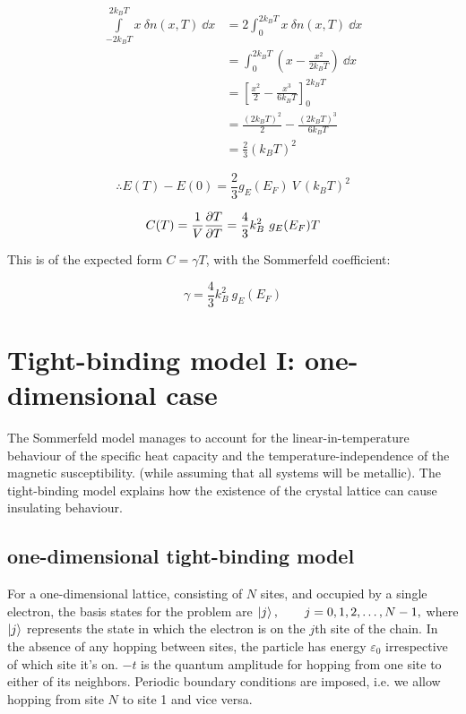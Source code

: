 \documentclass[10pt, a4paper, twocolumn]{article}
\newcommand{\eps}{\ensuremath{\varepsilon _0}}
\begin{document}
\begin{equation*}
\begin{aligned}
\int\limits_{-2k_BT}^{2k_BT}
x \ \delta n (x, T) \ \dd x &=
2 \int _0^{2 k_B T} x \ \delta n(x,T) \ \dd x
\\ &= \int _0^{2 k_B T}
\left( x - \frac{x^2}{2 k_B T} \right) \ \dd x
\\ &= \left[ \frac{x^2}{2} - \frac{x^3}{6 k_B T} \right]
_0^{2 k_B T}
\\ &= \frac{(2 k_B T)^2}{2}
- \frac{(2 k_B T)^3}{6 k_BT}
\\ &= \frac23 (k_B T)^2
\end{aligned}
\end{equation*}

\[\therefore E(T) - E(0) = \frac23 g_E (E_F) \ V
\ (k_B T)^2 \]

\[ C(T) = \frac1V \pdv{T}{T} = \frac43 k_B ^2
\ g_E(E_F) T \]

This is of the expected form $C = \gamma T$, with the Sommerfeld coefficient:

\[ \gamma = \frac43 k_B^2 \ g_E(E_F) \]

\section{Tight-binding model I: one-dimensional case}

The Sommerfeld model manages to account for the linear-in-temperature behaviour of the specific heat capacity and the temperature-independence of the magnetic susceptibility. (while assuming that all systems will be metallic). The tight-binding model explains how the existence of the crystal lattice can cause insulating behaviour.

\subsection{one-dimensional tight-binding model}

For a one-dimensional lattice, consisting of $N$ sites, and occupied by a single electron, the basis states for the problem are
$ \ket j, \qquad j = 0, 1, 2, \ldots , N-1, $
where $\ket j$ represents the state in which the electron is on the $j$th site of the chain. In the absence of any hopping between sites, the particle has energy $\eps$ irrespective of which site it's on. $-t$ is the quantum amplitude for hopping from one site to either of its neighbors. Periodic boundary conditions are imposed, i.e. we allow hopping from site $N$ to site 1 and vice versa.
\end{document}
